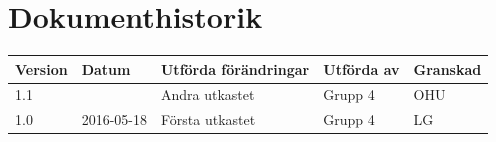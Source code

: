 \documentclass[11pt]{article}
\begin{document}
\tableofcontents

\pagebreak

\section*{Dokumenthistorik}
\begin{table}[h]
\begin{tabular}{|l|l|l|l|l|} \hline

\textbf{Version} & \textbf{Datum} & \textbf{Utförda förändringar} & \textbf{Utförda av} & \textbf{Granskad} \\ \hline
1.1 &  &  Andra utkastet & Grupp 4 & OHU \\ \hline
1.0 & 2016-05-18 &  Första utkastet & Grupp 4 & LG \\ \hline
\end{tabular}
\end{table}

\pagebreak
{}
\end{document}

